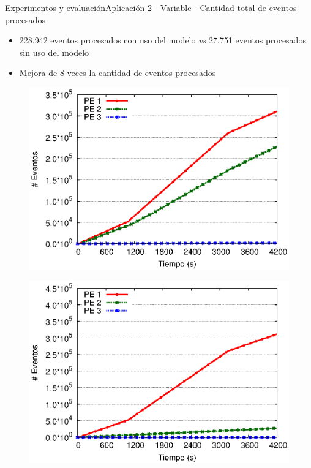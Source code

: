 \begin{frame}{Experimentos y evaluación}{Aplicación 2 - Variable - Cantidad total de eventos procesados}

\begin{itemize}
\item 228.942 eventos procesados con uso del modelo \textit{vs} 27.751 eventos procesados sin uso del modelo
\item Mejora de 8 veces la cantidad de eventos procesados
\end{itemize}

\begin{multicols}{2}
\begin{figure}[p]
	\centering
	\includegraphics[scale=0.475]{images/exp/app2/normal/cm/eventCount.eps}
\end{figure}

\begin{figure}[p]
	\centering
	\includegraphics[scale=0.475]{images/exp/app2/normal/sm/eventCount.eps}
\end{figure}
\end{multicols}
\end{frame}

